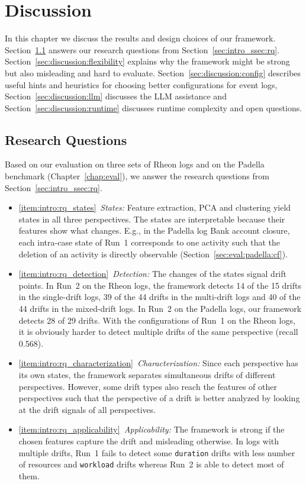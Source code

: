 \chapter{Discussion}
\label{chap:discussion}
In this chapter we discuss the results and design choices of our framework. Section~\ref{sec:discussion:rq} answers our research questions from Section~\ref{sec:intro_ssec:rq}. Section~\ref{sec:discussion:flexibility} explains why the framework might be strong but also misleading and hard to evaluate. Section~\ref{sec:discussion:config} describes useful hints and heuristics for choosing better configurations for event logs, Section~\ref{sec:discussion:llm} discusses the LLM assistance and Section~\ref{sec:discussion:runtime} discusses runtime complexity and open questions.

\section{Research Questions}
\label{sec:discussion:rq}
Based on our evaluation on three sets of Rheon logs and on the Padella benchmark (Chapter~\ref{chap:eval}), we answer the research questions from Section~\ref{sec:intro_ssec:rq}.

\begin{itemize}
	\item \ref{item:intro:rq_states}~\emph{States:} Feature extraction, PCA and clustering yield states in all three perspectives. The states are interpretable because their features show what changes. E.g., in the Padella log Bank account closure, each intra-case state of Run~1 corresponds to one activity such that the deletion of an activity is directly observable (Section~\ref{sec:eval:padella:cf}).
	\item \ref{item:intro:rq_detection}~\emph{Detection:} The changes of the states signal drift points. In Run~2 on the Rheon logs, the framework detects 14 of the 15 drifts in the single-drift logs, 39 of the 44 drifts in the multi-drift logs and 40 of the 44 drifts in the mixed-drift logs. In Run~2 on the Padella logs, our framework detects 28 of 29 drifts. With the configurations of Run~1 on the Rheon logs, it is obviously harder to detect multiple drifts of the same perspective (recall 0.568).
	\item \ref{item:intro:rq_characterization}~\emph{Characterization:} Since each perspective has its own states, the framework separates simultaneous drifts of different perspectives. However, some drift types also reach the features of other perspectives such that the perspective of a drift is better analyzed by looking at the drift signals of all perspectives.
	\item \ref{item:intro:rq_applicability}~\emph{Applicability:} The framework is strong if the chosen features capture the drift and misleading otherwise. In logs with multiple drifts, Run~1 fails to detect some \texttt{duration} drifts with less number of resources and \texttt{workload} drifts whereas Run~2 is able to detect most of them.
\end{itemize}

